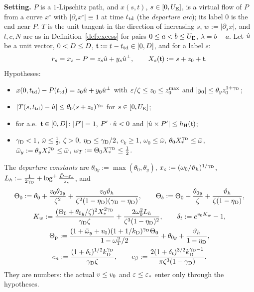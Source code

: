 \noindent\textbf{Setting.} $P$ is a $1$-Lipschitz path, and $x(s,t)$, $s\in[0,U_{\mathrm E}]$, is a virtual flow of $P$ from a curve
$x^\circ$ with $|\partial_sx^\circ|\equiv1$ at time $t_{\mathrm{td}}$ (the \emph{departure arc}); its label $0$ is the end near $P$. $T$ is the
unit tangent in the direction of increasing $s$, $w:=|\partial_sx|$, and $l,c,N$ are as in Definition~\ref{def:excess} for pairs
$0\le a<b\le U_{\mathrm E}$, $\lambda=b-a$. Let $\hat u$ be a unit vector, $0<D\le\bar D$, $\mathfrak t:=t-t_{\mathrm{td}}\in[0,D]$, and for a label $s$:
\[
r_s=x_s-P=z_s\hat u+y_s\hat u^\perp,\qquad X_s(\mathfrak t):=s+z_0+\mathfrak t .
\]
Hypotheses:
\begin{itemize}
\item[(D0)] $x(0,t_{\mathrm{td}})-P(t_{\mathrm{td}})=z_0\hat u+y_0\hat u^\perp$ with $\varepsilon/\zeta\le z_0\le z_0^{\max}$ and $|y_0|\le\theta_yz_0^{1+\gamma_{\mathrm D}}$;
\item[(D1)] $|T(s,t_{\mathrm{td}})-\hat u|\le\theta_0(s+z_0)^{\gamma_{\mathrm D}}$ for $s\in[0,U_{\mathrm E}]$;
\item[(D2)] for a.e.\ $\mathfrak t\in[0,D]$: $|P'|=1$, $P'\cdot\hat u<0$ and $|\hat u\times P'|\le h_{\mathrm H}(\mathfrak t)$;
\item[(D3)] $\gamma_{\mathrm D}<1$, $\bar\omega\le\frac12$, $\zeta>0$, $\eta_{\mathrm D}\le\gamma_{\mathrm D}/2$, $c_k\ge1$, $\omega_0\le\bar\omega$, $\theta_0X_*^{\gamma_{\mathrm D}}\le\bar\omega$,
$\bar\omega_y:=\theta_yX_*^{\gamma_{\mathrm D}}\le\bar\omega$, $\omega_T:=\Theta_0X_*^{\gamma_{\mathrm D}}\le\frac12$.
\end{itemize}
The \emph{departure constants} are $\theta_{0y}:=\max(\theta_0,\theta_y)$, $x_c:=(\omega_0/\vartheta_h)^{1/\gamma_{\mathrm D}}$,
$L_h:=\frac1{2\gamma_{\mathrm D}}+\log^+\frac{\bar D+\varepsilon_*}{x_c}$, and
\begin{equation}\label{eq:dep-const}
\begin{gathered}
\Theta_0:=\theta_0+\frac{v_0\theta_{0y}}{\zeta^2}+\frac{v_0\vartheta_h}{\zeta^2(1-\eta_{\mathrm D})(\gamma_{\mathrm D}-\eta_{\mathrm D})},\qquad
\Theta_b:=\Theta_0+\frac{\theta_{0y}}\zeta+\frac{\vartheta_h}{\zeta(1-\eta_{\mathrm D})},\\
K_w:=\frac{(\Theta_0+\theta_{0y}/\zeta)^2X_*^{2\gamma_{\mathrm D}}}{\gamma_{\mathrm D}\zeta}+\frac{2\omega_0^2L_h}{\zeta^3(1-\eta_{\mathrm D})^2},\qquad
\delta_t:=e^{v_0 K_w}-1,\\
\Theta_{\mathrm p}:=\frac{(1+\bar\omega_y+v_0)(1+1/k_{\mathrm D})^{\gamma_{\mathrm D}}\Theta_0}{1-\omega_T^2/2}+\theta_{0y}+\frac{\vartheta_h}{1-\eta_{\mathrm D}},\\
c_n:=\frac{(1+\delta_t)^{1/2}k_{\mathrm D}^{\gamma_{\mathrm D}}}{\gamma_{\mathrm D}\zeta},\qquad
c_\beta:=\frac{2(1+\delta_t)^{3/2}k_{\mathrm D}^{\gamma_{\mathrm D}-1}}{\pi\zeta^3(1-\gamma_{\mathrm D})} .
\end{gathered}
\end{equation}
They are numbers: the actual $v\le v_0$ and $\varepsilon\le\varepsilon_*$ enter only through the hypotheses.

